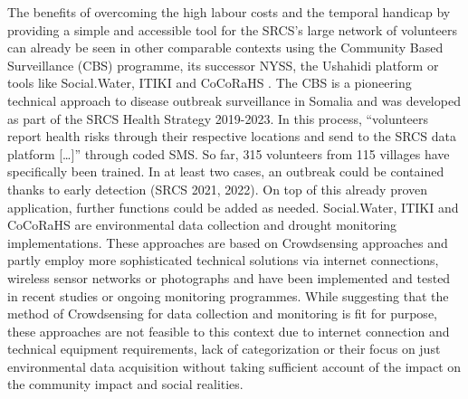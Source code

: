 {%



The benefits of overcoming the high labour costs and the temporal handicap by providing a simple and accessible tool for the SRCS’s large network of volunteers can already be seen in other comparable contexts using the Community Based Surveillance (CBS) programme, its successor NYSS, the Ushahidi platform or tools like Social.Water, ITIKI and CoCoRaHS \autocite{fienenSocialWaterCrowdsourcing2012a} . The CBS is a pioneering technical approach to disease outbreak surveillance in Somalia and was developed as part of the SRCS Health Strategy 2019-2023. In this process, “volunteers report health risks through their respective locations and send to the SRCS data platform […]” \autocite[57]{somaliredcrescentsocietyFeasibilityStudyPotential2022} through coded SMS. So far, 315 volunteers from 115 villages have specifically been trained. In at least two cases, an outbreak could be contained thanks to early detection (SRCS 2021, 2022). On top of this already proven application, further functions could be added as needed.
Social.Water, ITIKI and CoCoRaHS are environmental data collection and drought monitoring implementations. These approaches are based on Crowdsensing approaches and partly employ more sophisticated technical solutions via internet connections, wireless sensor networks or photographs and have been implemented and tested in recent studies or ongoing monitoring programmes. While suggesting that the method of Crowdsensing for data collection and monitoring is fit for purpose, these approaches are not feasible to this context due to internet connection and technical equipment requirements, lack of categorization or their focus on just environmental data acquisition without taking sufficient account of the impact on the community impact and social realities.

}

